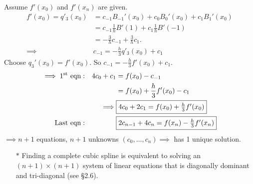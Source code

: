 \documentclass[]{article}
\begin{document}
Assume $f'(x_0)$ and $f'(x_n)$ are given.
\begin{align*}
	f'(x_0) = q'_3(x_0) &= c_{-1} B_{-1}'(x_0) + c_0 B_0'(x_0) + c_1 B_1'(x_0) \\
			  &= c_{-1} \frac1h B'(1) + c_1 \frac1h B'(-1) \\
			  &= -\frac3h c_{-1} + \frac3h c_1. \\
	\implies & c_{-1} = -\frac h3 q'_3(x_0) + c_1
\end{align*}
Choose $q_3'(x_0) = f'(x_0)$.
So \ul{$c_{-1} = -\frac h3 f'(x_0) + c_1$}.
\begin{align*}
	\implies 1^\text{st} \text{ eqn} &: & 4c_0 + c_1 &= f(x_0) - c_{-1} \\
									 &  & &= f(x_0) + \frac h3 f'(x_0) - c_1 \\
									 & & \implies & \fbox{$4c_0 + 2c_1 = f(x_0) + \frac h3 f'(x_0)$} \\
	\text{Last eqn} &: & & \fbox{$ 2c_{n-1} + 4c_n = f(x_n) - \frac h3 f'(x_n)$}
\end{align*}
$\implies n+1$ equations, $n+1$ unknowns $(c_0,\dots,c_n) \implies $ has 1 unique solution.
\begin{enumerate}
	\item[$*$] Finding a complete cubic spline is equivalent to solving an $(n+1)\times(n+1)$ system of linear equations that is diagonally dominant and tri-diagonal (see \S2.6).
\end{enumerate}
\end{document}
